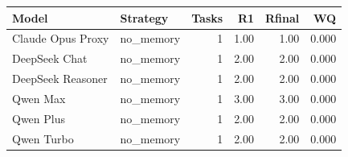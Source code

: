 \begin{tabular}{llrrrr}
\toprule
Model & Strategy & Tasks & R1 & Rfinal & WQ \\
\midrule
Claude Opus Proxy & no\_memory & 1 & 1.00 & 1.00 & 0.000 \\
DeepSeek Chat & no\_memory & 1 & 2.00 & 2.00 & 0.000 \\
DeepSeek Reasoner & no\_memory & 1 & 2.00 & 2.00 & 0.000 \\
Qwen Max & no\_memory & 1 & 3.00 & 3.00 & 0.000 \\
Qwen Plus & no\_memory & 1 & 2.00 & 2.00 & 0.000 \\
Qwen Turbo & no\_memory & 1 & 2.00 & 2.00 & 0.000 \\
\bottomrule
\end{tabular}

